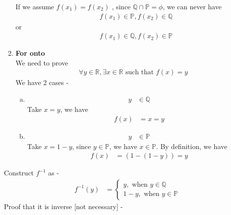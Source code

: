 \documentclass[12pt]{scrartcl}
\begin{document}
\begin{enumerate}
\begin{enumerate}[a.]
    \end{enumerate}
    If we assume $f(x_1) = f(x_2)$ , since $\mathbb{Q} \cap \mathbb{P} = \phi$, we can never have
        \begin{align*}
            & f(x_1)  \in \mathbb{P}, f(x_2) \in \mathbb{Q}
        \end{align*}
    or 
        \begin{align*}
            & f(x_1)  \in \mathbb{Q}, f(x_2) \in \mathbb{P}
        \end{align*}
        \item \textbf{For onto}
        \\ We need to prove 
        \begin{align*}
            \forall y \in \mathbb{R}, \exists x \in \mathbb{R} \text{ such that } f(x) = y
        \end{align*}
        We have 2 cases -
        \begin{enumerate}[a.]
            \item 
            \begin{align*}
                y & \in \mathbb{Q}
            \end{align*}
            Take $x = y$, we have 
            \begin{align*}
                f(x) &= x = y
            \end{align*}
            \item 
            \begin{align*}
                y & \in \mathbb{P}
            \end{align*}
            Take $x = 1 - y$, since $y \in \mathbb{P}$, we have $x \in \mathbb{P}$. By definition, we have 
            \begin{align*}
                f(x) &= (1 - (1 - y)) = y
            \end{align*}            
        \end{enumerate}
\end{enumerate}
Construct $f^{-1}$ as - 
\begin{align*}
    f^{-1}(y) &= \begin{cases}
    y , \text{ when }y \in \mathbb{Q} \\
    1 - y,  \text{ when } y \in \mathbb{P}
    \end{cases}
\end{align*}
Proof that it is inverse [not necessary] - 
\end{document}
